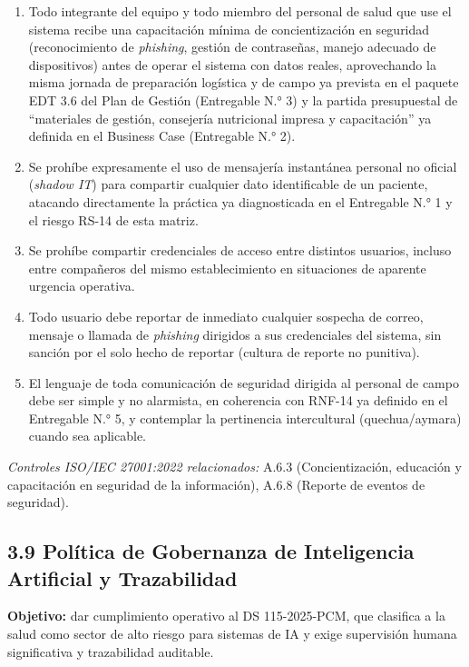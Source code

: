 \documentclass[11pt,a4paper]{article}
\providecommand{\tightlist}{%
  \setlength{\itemsep}{0pt}\setlength{\parskip}{0pt}}
\begin{document}
\begin{enumerate}
\def\labelenumi{\arabic{enumi}.}
\tightlist
\item
  Todo integrante del equipo y todo miembro del personal de salud que use el sistema recibe una capacitación mínima de concientización en seguridad (reconocimiento de \emph{phishing}, gestión de contraseñas, manejo adecuado de dispositivos) antes de operar el sistema con datos reales, aprovechando la misma jornada de preparación logística y de campo ya prevista en el paquete EDT 3.6 del Plan de Gestión (Entregable N.° 3) y la partida presupuestal de ``materiales de gestión, consejería nutricional impresa y capacitación'' ya definida en el Business Case (Entregable N.° 2).
\item
  Se prohíbe expresamente el uso de mensajería instantánea personal no oficial (\emph{shadow IT}) para compartir cualquier dato identificable de un paciente, atacando directamente la práctica ya diagnosticada en el Entregable N.° 1 y el riesgo RS-14 de esta matriz.
\item
  Se prohíbe compartir credenciales de acceso entre distintos usuarios, incluso entre compañeros del mismo establecimiento en situaciones de aparente urgencia operativa.
\item
  Todo usuario debe reportar de inmediato cualquier sospecha de correo, mensaje o llamada de \emph{phishing} dirigidos a sus credenciales del sistema, sin sanción por el solo hecho de reportar (cultura de reporte no punitiva).
\item
  El lenguaje de toda comunicación de seguridad dirigida al personal de campo debe ser simple y no alarmista, en coherencia con RNF-14 ya definido en el Entregable N.° 5, y contemplar la pertinencia intercultural (quechua/aymara) cuando sea aplicable.
\end{enumerate}

\emph{Controles ISO/IEC 27001:2022 relacionados:} A.6.3 (Concientización, educación y capacitación en seguridad de la información), A.6.8 (Reporte de eventos de seguridad).

\subsection{3.9 Política de Gobernanza de Inteligencia Artificial y Trazabilidad}\label{poluxedtica-de-gobernanza-de-inteligencia-artificial-y-trazabilidad}

\textbf{Objetivo:} dar cumplimiento operativo al DS 115-2025-PCM, que clasifica a la salud como sector de alto riesgo para sistemas de IA y exige supervisión humana significativa y trazabilidad auditable.
\end{document}

